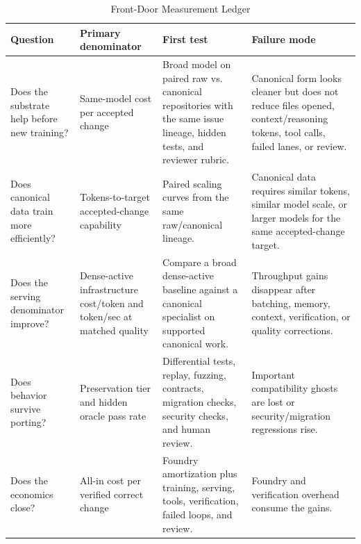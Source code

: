 \documentclass[conference]{IEEEtran}
\begin{document}
\begin{table}[!t]
\caption{Front-Door Measurement Ledger}
\label{tab:frontledger}
\centering
\footnotesize
\renewcommand{\arraystretch}{1.14}
\begin{tabularx}{\textwidth}{p{}p{}X X}
\toprule
\textbf{Question} & \textbf{Primary denominator} & \textbf{First test} & \textbf{Failure mode} \\
\midrule
Does the substrate help before new training? & Same-model cost per accepted change & Broad model on paired raw vs. canonical repositories with the same issue lineage, hidden tests, and reviewer rubric. & Canonical form looks cleaner but does not reduce files opened, context/reasoning tokens, tool calls, failed lanes, or review. \\
Does canonical data train more efficiently? & Tokens-to-target accepted-change capability & Paired scaling curves from the same raw/canonical lineage. & Canonical data requires similar tokens, similar model scale, or larger models for the same accepted-change target. \\
Does the serving denominator improve? & Dense-active infrastructure cost/token and token/sec at matched quality & Compare a broad dense-active baseline against a canonical specialist on supported canonical work. & Throughput gains disappear after batching, memory, context, verification, or quality corrections. \\
Does behavior survive porting? & Preservation tier and hidden oracle pass rate & Differential tests, replay, fuzzing, contracts, migration checks, security checks, and human review. & Important compatibility ghosts are lost or security/migration regressions rise. \\
Does the economics close? & All-in cost per verified correct change & Foundry amortization plus training, serving, tools, verification, failed loops, and review. & Foundry and verification overhead consume the gains. \\
\bottomrule
\end{tabularx}
\end{table}

\end{document}
